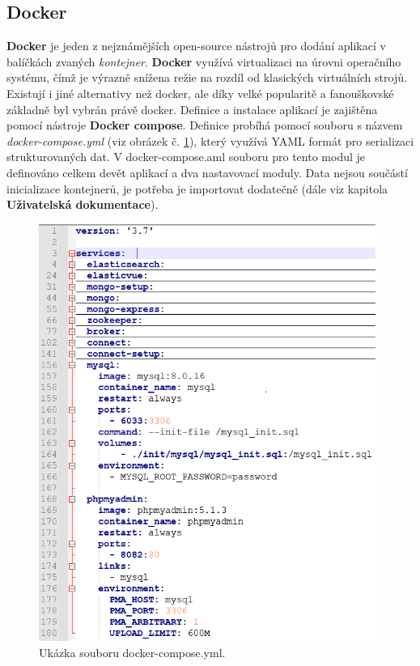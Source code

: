 \subsection{Docker}
\textbf{Docker} je jeden z nejznámějších open-source nástrojů pro dodání aplikací v balíčkách zvaných \textit{kontejner}. \textbf{Docker} využívá virtualizaci na úrovni operačního systému, čímž je výrazně snížena režie na rozdíl od klasických virtuálních strojů. Existují i jiné alternativy než docker, ale díky velké popularitě a fanouškovské základně byl vybrán právě docker.
\newline
\indent Definice a instalace aplikací je zajištěna pomocí nástroje \textbf{Docker compose}. Definice probíhá pomocí souboru s názvem \textit{docker-compose.yml} (viz obrázek č. \ref{fig:compose}), který využívá \gls{YAML} formát pro serializaci strukturovaných dat. V docker-compose.aml souboru pro tento modul je definováno celkem devět aplikací a dva nastavovací moduly. Data nejsou součástí inicializace kontejnerů, je potřeba je importovat dodatečně (dále viz kapitola \textbf{Uživatelská dokumentace}).
\begin{figure}[H]
\centering
\includegraphics[width=11cm]{img/compose}
\caption{Ukázka souboru docker-compose.yml.}
\label{fig:compose}
\end{figure}

